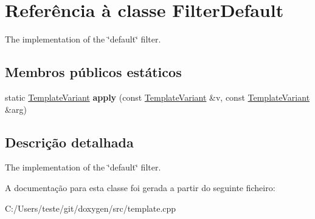 \hypertarget{class_filter_default}{\section{Referência à classe Filter\-Default}
\label{class_filter_default}
}


The implementation of the \char`\"{}default\char`\"{} filter.  


\subsection*{Membros públicos estáticos}
\begin{DoxyCompactItemize}
\item 
\hypertarget{class_filter_default_a3987885c759841073f6ba1225c0cd2b8}{static \hyperlink{class_template_variant}{Template\-Variant} {\bfseries apply} (const \hyperlink{class_template_variant}{Template\-Variant} \&v, const \hyperlink{class_template_variant}{Template\-Variant} \&arg)}\label{class_filter_default_a3987885c759841073f6ba1225c0cd2b8}

\end{DoxyCompactItemize}


\subsection{Descrição detalhada}
The implementation of the \char`\"{}default\char`\"{} filter. 

A documentação para esta classe foi gerada a partir do seguinte ficheiro\-:\begin{DoxyCompactItemize}
\item 
C\-:/\-Users/teste/git/doxygen/src/template.\-cpp\end{DoxyCompactItemize}

